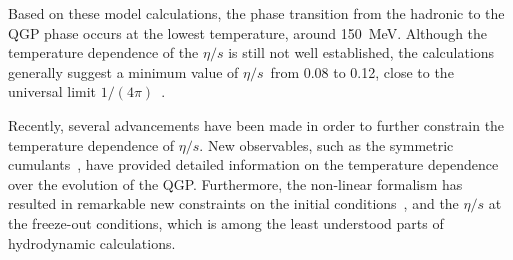 Based on these model calculations, the phase transition from the hadronic to the QGP phase occurs at the lowest temperature, around 150~MeV.
Although the temperature dependence of the $\eta/s$ is still not well established, the calculations generally suggest a minimum value of $\eta/s$~from 0.08 to 0.12, close to the universal limit $1/(4\pi)$~\cite{Kovtun:2004de}.

Recently, several advancements have been made in order to further constrain the temperature dependence of $\eta/s$. New observables, such as the symmetric cumulants~\cite{ALICE:2016kpq,Acharya:2017gsw}, have provided detailed information on the temperature dependence over the evolution of the QGP. Furthermore, the non-linear formalism has resulted in remarkable new constraints on the initial conditions~\cite{Acharya:2017zfg}, and the $\eta/s$ at the freeze-out conditions, which is among the least understood parts of hydrodynamic calculations.














